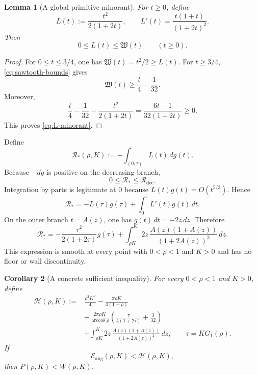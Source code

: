 \documentclass[11pt]{article}
\newtheorem{lemma}{Lemma}
\newtheorem{corollary}[lemma]{Corollary}
\theoremstyle{remark}
\begin{document}
\begin{lemma}[A global primitive minorant]
\label{lem:L-minorant}
For $t\geq0$, define
\begin{equation}
 L(t):=\frac{t^2}{2(1+2t)},
 \qquad
 L'(t)=\frac{t(1+t)}{(1+2t)^2}.
 \label{eq:L-def}
\end{equation}
Then
\begin{equation}
 0\leq L(t)\leq\mathfrak W(t)
 \qquad(t\geq0).
 \label{eq:L-minorant}
\end{equation}
\end{lemma}

\begin{proof}
For $0\leq t\leq3/4$, one has
$\mathfrak W(t)=t^2/2\geq L(t)$.  For $t\geq3/4$,
\eqref{eq:sawtooth-bounds} gives
\[
 \mathfrak W(t)\geq\frac t4-\frac1{32}.
\]
Moreover,
\[
 \frac t4-\frac1{32}-\frac{t^2}{2(1+2t)}
 =\frac{6t-1}{32(1+2t)}\geq0.
\]
This proves \eqref{eq:L-minorant}.
\end{proof}

Define
\begin{equation}
 \mathcal R_*(\rho,K):=-\int_{(0,\tau)}L(t)\,dg(t).
 \label{eq:R-star-def}
\end{equation}
Because $-dg$ is positive on the decreasing branch,
\begin{equation}
 0\leq\mathcal R_*\leq\mathcal R_{\mathrm{dec}}.
 \label{eq:R-star-order}
\end{equation}
Integration by parts is legitimate at $0$ because
$L(t)g(t)=O(t^{5/3})$.  Hence
\begin{equation}
 \mathcal R_*
 =-L(\tau)g(\tau)+\int_0^\tau L'(t)g(t)\,dt.
 \label{eq:R-star-parts}
\end{equation}
On the outer branch $t=A(z)$, one has
$g(t)\,dt=-2z\,dz$.  Therefore
\begin{equation}
 \mathcal R_*
 =-\frac{\tau^2}{2(1+2\tau)}g(\tau)
 +\int_{\rho K}^{K}
   2z\,\frac{A(z)(1+A(z))}{(1+2A(z))^2}\,dz.
 \label{eq:R-star-action}
\end{equation}
This expression is smooth at every point with $0<\rho<1$ and $K>0$ and has
no floor or wall discontinuity.

\begin{corollary}[A concrete sufficient inequality]
\label{cor:sufficient}
For every $0<\rho<1$ and $K>0$, define
\begin{equation}
 \begin{aligned}
 \mathcal H(\rho,K):={}&
 \frac{\rho^2K^2}{4}
 -\frac{\pi\rho K}{4(1-\rho)}\\
 &+\frac{2\pi\rho K}{\arccos\rho}
   \left(\frac{\tau}{4(1+2\tau)}+\frac3{32}\right)\\
 &+\int_{\rho K}^{K}
   2z\,\frac{A(z)(1+A(z))}{(1+2A(z))^2}\,dz,
 \qquad \tau=KG_1(\rho).
 \end{aligned}
 \label{eq:H-def}
\end{equation}
If
\begin{equation}
 \mathcal E_{\mathrm{ang}}(\rho,K)<\mathcal H(\rho,K),
 \label{eq:H-sufficient}
\end{equation}
then $P(\rho,K)<W(\rho,K)$.
\end{corollary}
\end{document}
